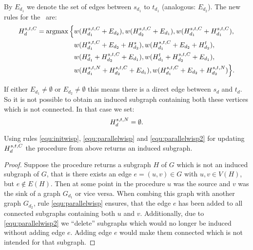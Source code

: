 By $E_{d_1}$ we denote the set of edges between $s_{d_1}$ to $t_{d_1}$ (analogous: $E_{d_2}$). The new rules for the \WISP\ are:
\begin{equation}
	\label{equ:parallelwisp}
	\begin{alignedat}{4}
		H_{d}^{s,t,C} &= \operatorname*{argmax} \Big\{ &&w(H_{d_1}^{s,t,C} + E_{d_2}), w(H_{d_2}^{s,t,C} + E_{d_1}), w(H_{d_1}^{s,t,C} + H_{d_1}^{s,t,C}), \\ 
		& &&w(H_{d_1}^{s,t,C} + E_{d_2} + H_{d_2}^{s}), w(H_{d_1}^{s,t,C} + E_{d_2} + H_{d_2}^{t}), \\
		& &&w(H_{d_1}^{s} + H_{d_2}^{s,t,C} + E_{d_1}), w(H_{d_1}^{t} + H_{d_2}^{s,t,C} + E_{d_1}), \\
		& &&w(H_{d_1}^{s,t,N} + H_{d_2}^{s,t,C} + E_{d_1}), w(H_{d_1}^{s,t,C} + E_{d_2} + H_{d_2}^{s,t,N}) \Big\}.		
	\end{alignedat}
\end{equation}

If either $E_{d_1} \neq \emptyset$ or $E_{d_2}  \neq \emptyset$ this means there is a direct edge between $s_{d}$ and $t_{d}$. So it is not possible to obtain an induced subgraph containing both these vertices which is not connected. In that case we set:
\begin{equation}
\label{equ:parallelwisp2}
	H_{d}^{s,t,N} = \emptyset.
\end{equation}

\begin{lemma}
	\label{lemma:wispsp}
	Using rules \eqref{equ:initwisp}, \eqref{equ:parallelwisp} and \eqref{equ:parallelwisp2} for updating $H_{d}^{s,t,C}$ the procedure from above returns an induced subgraph.
\end{lemma}
\begin{proof}
	Suppose the procedure returns a subgraph $H$ of $G$ which is not an induced subgraph of $G$, that is there exists an edge $e=(u, v) \in G$ with $u, v \in V(H)$, but $e \notin E(H)$. Then at some point in the procedure $u$ was the source and $v$ was the sink of a graph $G_{d_1}$ or vice versa. When combing this graph with another graph $G_{d_2}$, rule \eqref{equ:parallelwisp} ensures, that the edge $e$ has been added to all connected subgraphs containing both $u$ and $v$. Additionally, due to \eqref{equ:parallelwisp2} we ``delete'' subgraphs which would no longer be induced without adding edge $e$. Adding edge $e$ would make them connected which is not intended for that subgraph.
\end{proof}


